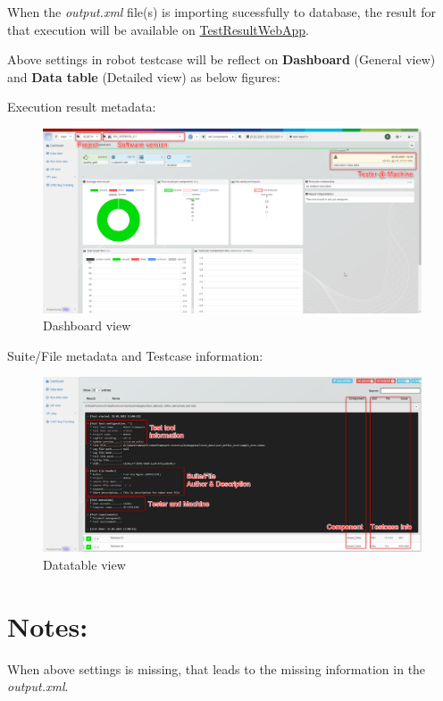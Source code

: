 When the \emph{output.xml} file(s) is importing sucessfully to database,
the result for that execution will be available on
\href{https://github.com/test-fullautomation/testresultwebapp}{TestResultWebApp}.

Above settings in robot testcase will be reflect on \textbf{Dashboard}
(General view) and \textbf{Data table} (Detailed view) as below figures:

Execution result metadata:

\begin{figure}[h!]
  \includegraphics[width=1\linewidth]{./pictures/Dashboard.png}
  \caption{Dashboard view}
\end{figure}

Suite/File metadata and Testcase information:

\begin{figure}[h!]
  \includegraphics[width=1\linewidth]{./pictures/Datatable.png}
  \caption{Datatable view}
\end{figure}


\hypertarget{description-notes}{%
\section{Notes:}\label{description-notes}}

When above settings is missing, that leads to the missing information in
the \emph{output.xml}.


